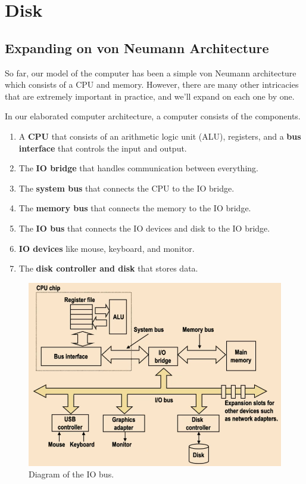 \section{Disk}

\subsection{Expanding on von Neumann Architecture} 

  So far, our model of the computer has been a simple von Neumann architecture which consists of a CPU and memory. However, there are many other intricacies that are extremely important in practice, and we'll expand on each one by one. 
  
  \begin{definition}
    In our elaborated computer architecture, a computer consists of the components. 
    \begin{enumerate}
      \item A \textbf{CPU} that consists of an arithmetic logic unit (ALU), registers, and a \textbf{bus interface} that controls the input and output. 
      \item The \textbf{IO bridge} that handles communication between everything. 
      \item The \textbf{system bus} that connects the CPU to the IO bridge. 
      \item The \textbf{memory bus} that connects the memory to the IO bridge. 
      \item The \textbf{IO bus} that connects the IO devices and disk to the IO bridge. 
      \item \textbf{IO devices} like mouse, keyboard, and monitor. 
      \item The \textbf{disk controller and disk} that stores data. 
    \end{enumerate} 
    \begin{figure}[H]
      \centering 
      \includegraphics[scale=0.4]{img/io.png}
      \caption{Diagram of the IO bus.} 
      \label{fig:io}
    \end{figure}
  \end{definition}

